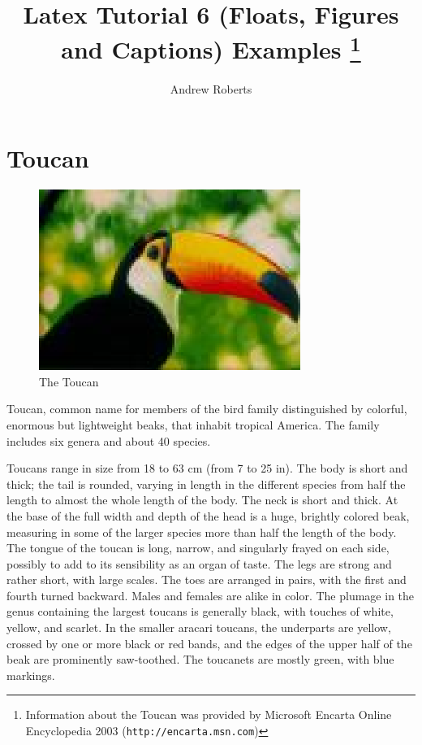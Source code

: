 \documentclass[english]{article}
\begin{document}
\title{Latex Tutorial 6 (Floats, Figures and Captions) Examples
\thanks{Information about the Toucan was provided by Microsoft Encarta
Online Encyclopedia 2003 (\texttt{http://encarta.msn.com})}}

\author{Andrew Roberts}
\maketitle

\section*{Toucan}

\begin{figure}
  \begin{center}
    \includegraphics{toucan.eps}
  \end{center}
  \caption{The Toucan}
\end{figure}

Toucan, common name for members of the bird family distinguished by
colorful, enormous but lightweight beaks, that inhabit tropical America.
The family includes six genera and about 40 species.


Toucans range in size from 18 to 63 cm (from 7 to 25 in). The body is
short and thick; the tail is rounded, varying in length in the different
species from half the length to almost the whole length of the body. The
neck is short and thick. At the base of the full width and depth of the
head is a huge, brightly colored beak, measuring in some of the larger
species more than half the length of the body. The tongue of the toucan
is long, narrow, and singularly frayed on each side, possibly to add to
its sensibility as an organ of taste. The legs are strong and rather
short, with large scales. The toes are arranged in pairs, with the first
and fourth turned backward. Males and females are alike in color. The
plumage in the genus containing the largest toucans is generally black,
with touches of white, yellow, and scarlet. In the smaller aracari
toucans, the underparts are yellow, crossed by one or more black or red
bands, and the edges of the upper half of the beak are prominently
saw-toothed. The toucanets are mostly green, with blue markings.
\end{document}
